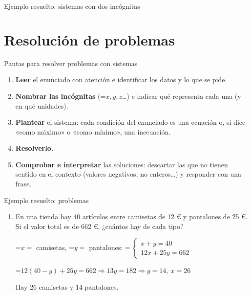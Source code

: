 \documentclass[11pt,a4paper]{article}
\newcommand{\fmm}[1]{\setbox0=\hbox{$#1$}\ifdim\wd0>\linewidth\fmdisp{#1}\else\mbox{\box0}\fi}
\newcommand{\fmdisp}[1]{\[\setbox2=\hbox{$\displaystyle #1$}\ifdim\wd2>\linewidth\resizebox{\linewidth}{!}{\box2}\else\box2\fi\]}
\begin{document}
\begin{fmex}{Ejemplo resuelto: sistemas con dos incógnitas}
\begin{enumerate}[label=\textbf{\arabic*.},leftmargin=*]
\begin{center}\end{center}
\end{enumerate}
\end{fmex}

\section{Resolución de problemas}\hypertarget{sec6}{}
\begin{fmprop}{Pautas para resolver problemas con sistemas}
\begin{enumerate}
\item \textbf{Leer} el enunciado con atención e identificar los datos y lo que se pide.
\item \textbf{Nombrar las incógnitas} (\fmm{x,y,z}\dots{}) e indicar qué representa cada una (y en qué unidades).
\item \textbf{Plantear} el sistema: cada condición del enunciado es una ecuación o, si dice «como máximo» o «como mínimo», una inecuación.
\item \textbf{Resolverlo.}
\item \textbf{Comprobar e interpretar} las soluciones: descartar las que no tienen sentido en el contexto (valores negativos, no enteros\dots{}) y responder con una frase.
\end{enumerate}
\end{fmprop}

\begin{fmex}{Ejemplo resuelto: problemas}
\begin{enumerate}[label=\textbf{\arabic*.},leftmargin=*]
\item En una tienda hay 40 artículos entre camisetas de 12 € y pantalones de 25 €. Si el valor total es de 662 €, ¿cuántos hay de cada tipo?

\fmm{x=} camisetas, \fmm{y=} pantalones: \fmm{\ \begin{cases}x+y=40\\ 12x+25y=662\end{cases}}

\fmm{12(40-y)+25y=662\Rightarrow13y=182\Rightarrow y=14,\ x=26}

Hay 26 camisetas y 14 pantalones.
\end{enumerate}
\end{fmex}

  
\end{document}
